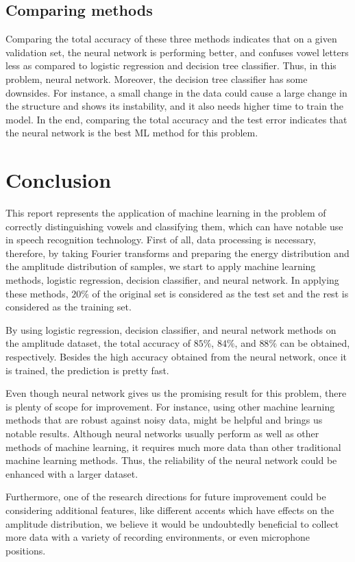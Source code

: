 \documentclass[letterpaper,12pt]{article}
\begin{document}
\subsection{Comparing methods}

Comparing the total accuracy of these three methods indicates that on a given validation set, the neural network is performing better, and confuses vowel letters less as compared to logistic regression and decision tree classifier. Thus, in this problem, neural network. Moreover, the decision tree classifier has some downsides. For instance, a small change in the data could cause a large change in the structure and shows its instability, and it also needs higher time to train the model. In the end, comparing the total accuracy and the test error indicates that the neural network is the best ML method for this problem.

\section{Conclusion}
This report represents the application of machine learning in the problem of correctly distinguishing vowels and classifying them, which can have notable use in speech recognition technology. First of all, data processing is necessary, therefore, by taking Fourier transforms and preparing the energy distribution and the amplitude distribution of samples, we start to apply machine learning methods, logistic regression, decision classifier, and neural network. In applying these methods, $20\%$ of the original set is considered as the test set and the rest is considered as the training set.

By using logistic regression, decision classifier, and neural network methods on the amplitude dataset, the total accuracy of $85\%$, $84\%$, and $88\%$ can be obtained, respectively. Besides the high accuracy obtained from the neural network, once it is trained, the prediction is pretty fast.

Even though neural network gives us the promising result for this problem, there is plenty of scope for improvement. For instance, using other machine learning methods that are robust against noisy data, might be helpful and brings us notable results. Although neural networks usually perform as well as other methods of machine learning, it requires much more data than other traditional machine learning methods. Thus, the reliability of the neural network could be enhanced with a larger dataset.

Furthermore, one of the research directions for future improvement could be considering additional features, like different accents which have effects on the amplitude distribution, we believe it would be undoubtedly beneficial to collect more data with a variety of recording environments, or even microphone positions.
\end{document}
